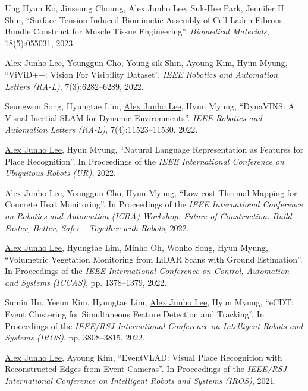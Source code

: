 \documentclass[margin]{res}
\begin{document}
\begin{resume}
		\par Ung Hyun Ko, Jinseung Choung, \underline{Alex Junho Lee}, Suk-Hee Park, Jennifer H. Shin, ``Surface Tension-Induced Biomimetic Assembly of Cell-Laden Fibrous Bundle Construct for Muscle Tissue Engineering''. \textit{Biomedical Materials}, 18(5):055031, 2023.

		\par\underline{Alex Junho Lee}, Younggun Cho, Young-sik Shin, Ayoung Kim, Hyun Myung, ``ViViD++: Vision For Visibility Dataset''. \textit{IEEE Robotics and Automation Letters (RA-L)}, 7(3):6282--6289, 2022.

		\par Seungwon Song, Hyungtae Lim, \underline{Alex Junho Lee}, Hyun Myung, ``DynaVINS: A Visual-Inertial SLAM for Dynamic Environments''. \textit{IEEE Robotics and Automation Letters (RA-L)}, 7(4):11523--11530, 2022.

		\par\underline{Alex Junho Lee}, Hyun Myung, ``Natural Language Representation as Features for Place Recognition''. In Proceedings of the \textit{IEEE International Conference on Ubiquitous Robots (UR)}, 2022.

		\par\underline{Alex Junho Lee}, Younggun Cho, Hyun Myung, ``Low-cost Thermal Mapping for Concrete Heat Monitoring''. In Proceedings of the \textit{IEEE International Conference on Robotics and Automation (ICRA) Workshop: Future of Construction: Build Faster, Better, Safer - Together with Robots}, 2022.

		\par\underline{Alex Junho Lee}, Hyungtae Lim, Minho Oh, Wonho Song, Hyun Myung, ``Volumetric Vegetation Monitoring from LiDAR Scans with Ground Estimation''. In Proceedings of the \textit{IEEE International Conference on Control, Automation and Systems (ICCAS)}, pp. 1378--1379, 2022.

		\par Sumin Hu, Yeeun Kim, Hyungtae Lim, \underline{Alex Junho Lee}, Hyun Myung, ``eCDT: Event Clustering for Simultaneous Feature Detection and Tracking''. In Proceedings of the \textit{IEEE/RSJ International Conference on Intelligent Robots and Systems (IROS)}, pp. 3808--3815, 2022.

		\par\underline{Alex Junho Lee}, Ayoung Kim, ``EventVLAD: Visual Place Recognition with Reconstructed Edges from Event Cameras''. In Proceedings of the \textit{IEEE/RSJ International Conference on Intelligent Robots and Systems (IROS)}, 2021.


\end{resume}
\end{document}
